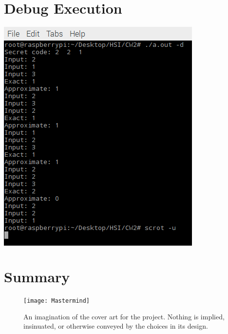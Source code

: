 \documentclass[a4paper, titlepage]{article}
\begin{document}
\section{Debug Execution}
\begin{center}
	\includegraphics{Debug}
\end{center}


\section{Summary}


\begin{figure}
	\centering
	\texttt{[image: Mastermind]}
	\caption{An imagination of the cover art for the project. Nothing is implied, insinuated, or otherwise conveyed by the choices in its design.}
\end{figure}
\end{document}
